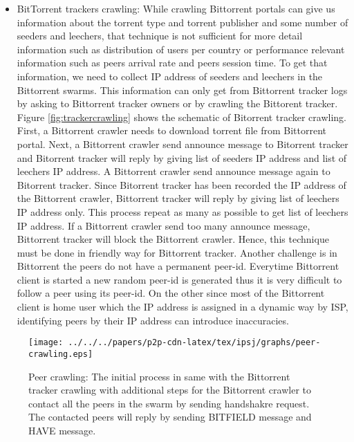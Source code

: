 \begin{itemize}
\item BitTorrent trackers crawling:
While crawling Bittorrent portals can give us information about the torrent type and torrent publisher and some number of seeders and leechers, that technique is not sufficient for more detail information such as distribution of users per country or performance relevant information such as peers arrival rate and peers session time.
To get that information, we need to collect IP address of seeders and leechers in the Bittorrent swarms.  
This information can only get from Bittorrent tracker logs by asking to Bittorrent tracker owners or by crawling the Bittorent tracker.
Figure \ref{fig:trackercrawling} shows the schematic of Bitorrent tracker crawling.  
First, a Bittorrent crawler needs to download torrent file from Bittorrent portal.  
Next, a Bittorrent crawler send announce message to Bitorrent tracker and Bitorrent tracker will reply by giving list of seeders IP address and list of leechers IP address.  
A Bittorrent crawler send announce message again to Bitorrent tracker. 
Since Bitorrent tracker has been recorded the IP address of the Bittorrent crawler, Bittorrent tracker will reply by giving list of leechers IP address only. 
This process repeat as many as possible to get list of leechers IP address.
If a Bittorrent crawler send too many announce message, Bittorrent tracker will block the Bittorrent crawler. 
Hence, this technique must be done in friendly way for Bittorrent tracker.
Another challenge is in Bittorrent the peers do not have a permanent peer-id.  
Everytime Bittorrent client is started a new random peer-id is generated thus it is very difficult to follow a peer using its peer-id. 
On the other since most of the Bittorrent client is home user which the IP address is assigned in a dynamic way by ISP, identifying peers by their IP address can introduce inaccuracies. 
\end{itemize}

\begin{figure}[tb]
\begin{center}
\texttt{[image: ../../../papers/p2p-cdn-latex/tex/ipsj/graphs/peer-crawling.eps]}
\end{center}
\caption{Peer crawling: The initial process in same with the Bittorrent tracker crawling with additional steps for the Bittorrent crawler to contact all the peers in the swarm by sending handshakre request. The contacted peers will reply by sending BITFIELD message and HAVE message.} 
\label{fig:peeercrawling}
\end{figure}

